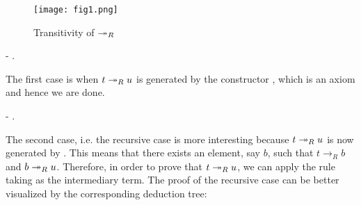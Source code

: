       \begin{figure}[h] \centering
        \texttt{[image: fig1.png]} \caption{Transitivity of
        $\tto_R$}\label{fig:trans} \end{figure} \begin{coqdoccode}
\coqdocemptyline
\coqdocindent{1.00em}
- . \end{coqdoccode}
The first case is when $t \tto_R u$ is generated
      by the constructor , which is an axiom and hence we are
      done. \begin{coqdoccode}
\coqdocemptyline
\coqdocindent{1.00em}
-    . \end{coqdoccode}
The second case, i.e. the recursive case
      is more interesting because $t \tto_R u$ is now generated by
      . This means that there exists an element, say $b$, such
      that $t \to_R b$ and $b \tto_R u$. Therefore, in order to prove
      that $t \tto_R u$, we can apply the rule  taking  as
      the intermediary term. The proof of the recursive case can be
      better visualized by the corresponding deduction tree:
      {\scriptsize \begin{mathpar}
       \end{mathpar}}


